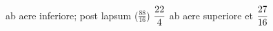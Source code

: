                      ab aere inferiore; post lapsum ($\displaystyle\frac{88}{16}$)%
                    $\rule[-4mm]{0mm}{10mm}\displaystyle\frac{22}{4}$ ab aere superiore et $\rule[-4mm]{0mm}{10mm}\displaystyle\frac{27}{16}$
